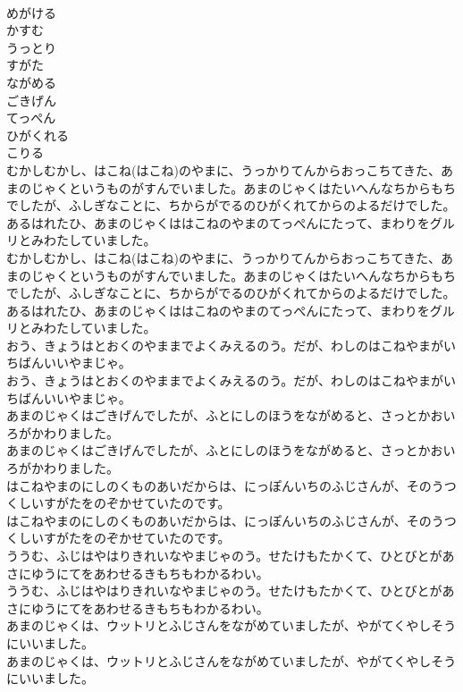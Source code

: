 \documentclass[8pt]{extreport}
\begin{document}
\begin{CJK}{UTF8}{min}
\\	めがける
\\	かすむ
\\	うっとり
\\	すがた
\\	ながめる
\\	ごきげん
\\	てっぺん
\\	ひがくれる
\\	こりる
\\	むかしむかし、はこね(はこね)のやまに、うっかりてんからおっこちてきた、あまのじゃくというものがすんでいました。あまのじゃくはたいへんなちからもちでしたが、ふしぎなことに、ちからがでるのひがくれてからのよるだけでした。あるはれたひ、あまのじゃくははこねのやまのてっぺんにたって、まわりをグルリとみわたしていました。
\\	むかしむかし、はこね(はこね)のやまに、うっかりてんからおっこちてきた、あまのじゃくというものがすんでいました。あまのじゃくはたいへんなちからもちでしたが、ふしぎなことに、ちからがでるのひがくれてからのよるだけでした。あるはれたひ、あまのじゃくははこねのやまのてっぺんにたって、まわりをグルリとみわたしていました。
\\	おう、きょうはとおくのやままでよくみえるのう。だが、わしのはこねやまがいちばんいいやまじゃ。
\\	おう、きょうはとおくのやままでよくみえるのう。だが、わしのはこねやまがいちばんいいやまじゃ。
\\	あまのじゃくはごきげんでしたが、ふとにしのほうをながめると、さっとかおいろがかわりました。
\\	あまのじゃくはごきげんでしたが、ふとにしのほうをながめると、さっとかおいろがかわりました。
\\	はこねやまのにしのくものあいだからは、にっぽんいちのふじさんが、そのうつくしいすがたをのぞかせていたのです。
\\	はこねやまのにしのくものあいだからは、にっぽんいちのふじさんが、そのうつくしいすがたをのぞかせていたのです。
\\	ううむ、ふじはやはりきれいなやまじゃのう。せたけもたかくて、ひとびとがあさにゆうにてをあわせるきもちもわかるわい。　
\\	ううむ、ふじはやはりきれいなやまじゃのう。せたけもたかくて、ひとびとがあさにゆうにてをあわせるきもちもわかるわい。　
\\	あまのじゃくは、ウットリとふじさんをながめていましたが、やがてくやしそうにいいました。
\\	あまのじゃくは、ウットリとふじさんをながめていましたが、やがてくやしそうにいいました。

\end{CJK}
\end{document}
